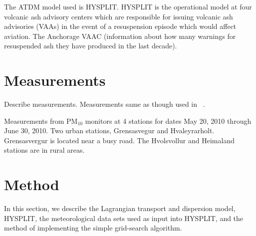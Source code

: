 
The ATDM model used is HYSPLIT. HYSPLIT is the operational model
at four volcanic ash advisory centers which are responsible for issuing volcanic ash advisories (VAAs) in the event of
a resuspension episode which would affect aviation.
The Anchorage VAAC (information about how many warnings for resuspended ash they have produced in the last decade).






\section{Measurements}

Describe measurements.
Measurements same as though used in ~\cite{Leadbetter12}.

Measurements from PM$_{10}$ monitors at  4 stations for dates May 20, 2010 through June 30, 2010.  
Two urban stations, Grensasvegur and Hvaleyrarholt. Grensasvergur is located near a busy road.
The Hvolsvollur and Heimaland stations are in rural areas.


\section{Method}
In this section, we describe the Lagrangian transport and dispersion  model, HYSPLIT, the meteorological data sets used as input into HYSPLIT, and the method of implementing the simple grid-search algorithm.

